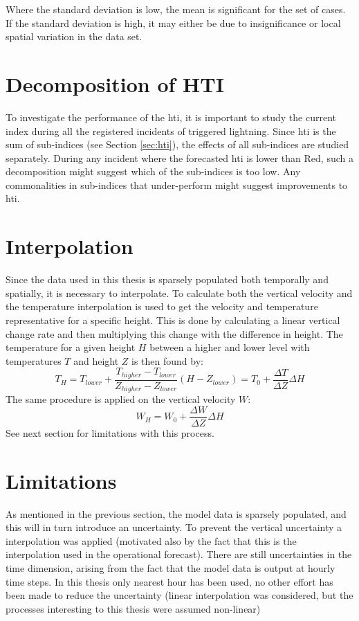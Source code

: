 Where the standard deviation is low, the mean is significant for the set of cases. If the standard deviation is high, it may either be due to insignificance or local spatial variation in the data set.

\section{Decomposition of HTI}\label{sec:decomposition}
To investigate the performance of the \acrlong{hti}, it is important to study the current index during all the registered incidents of triggered lightning. Since \acrshort{hti} is the sum of sub-indices (see Section \ref{sec:hti}), the effects of all sub-indices are studied separately. During any incident where the forecasted \acrshort{hti} is lower than Red, such a decomposition might suggest which of the sub-indices is too low. Any commonalities in sub-indices that under-perform might suggest improvements to \acrshort{hti}.

\section{Interpolation}\label{sec:interpolation}
Since the data used in this thesis is sparsely populated both temporally and spatially, it is necessary to interpolate. To calculate both the vertical velocity and the temperature interpolation is used to get the velocity and temperature representative for a specific height. This is done by calculating a linear vertical change rate and then multiplying this change with the difference in height. 
The temperature for a given height $H$ between a higher and lower level with temperatures $T$ and height $Z$ is then found by: 
\[ T_H = T_{lower} + \frac{T_{higher} - T_{lower}}{Z_{higher} - Z_{lower}} (H - Z_{lower}) = T_0 + \frac{\Delta T}{\Delta Z}\Delta H\]
The same procedure is applied on the vertical velocity $W$:
\[W_H = W_0 + \frac{\Delta W}{\Delta Z}\Delta H\]
See next section for limitations with this process.

\section{Limitations}\label{sec:limitations}
As mentioned in the previous section, the model data is sparsely populated, and this will in turn introduce an uncertainty. To prevent the vertical uncertainty a interpolation was applied (motivated also by the fact that this is the interpolation used in the operational forecast). There are still uncertainties in the time dimension, arising from the fact that the model data is output at hourly time steps. In this thesis only nearest hour has been used, no other effort has been made to reduce the uncertainty (linear interpolation was considered, but the processes interesting to this thesis were assumed non-linear)

